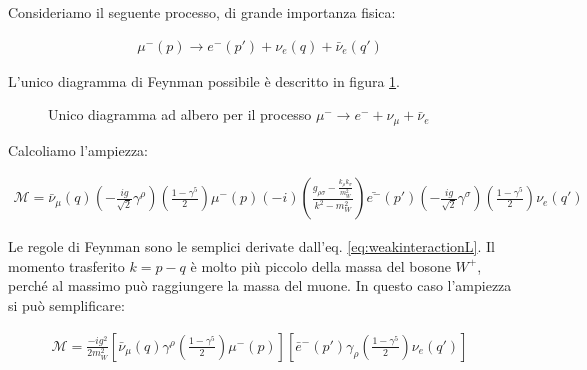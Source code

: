 \documentclass[11pt]{report}
\begin{document}
Consideriamo il seguente processo, di grande importanza fisica: 

\begin{align}
    \mu^-(p) \rightarrow e^-(p') + \nu_e(q) + \bar{\nu}_e(q')
\end{align}

L'unico diagramma di Feynman possibile è descritto in figura \ref{fig:betadecay}.

\begin{figure}
    \caption{Unico diagramma ad albero per il processo \(\mu^- \rightarrow e^- + \nu_\mu + \bar{\nu}_e\)}
    \label{fig:betadecay}
    \begin{center}
    \end{center}
\end{figure}

Calcoliamo l'ampiezza: 

\begin{align}
    \mathcal{M} = \bar{\nu}_\mu (q)\left(-\frac{ig}{\sqrt{2}}\gamma^\rho \right)\left(\frac{1-\gamma^5}{2} \right)\mu^-(p) (-i)\left(\frac{g_{\rho\sigma} - \frac{k_\rho k_\sigma}{m_W^2}}{k^2-m^2_W} \right)\bar{e^-}(p')\left(-\frac{ig}{\sqrt{2}}\gamma^\sigma \right)\left(\frac{1-\gamma^5}{2} \right)\nu_e(q')
\end{align}

Le regole di Feynman sono le semplici derivate dall'eq. \ref{eq:weakinteractionL}. Il momento trasferito \(k = p-q\) è molto più piccolo della massa del bosone \(W^+\), perché al massimo può raggiungere la massa del muone. In questo caso l'ampiezza si può semplificare: 

\begin{align}
    \mathcal{M} = \frac{-ig^2}{2m_W^2}\left[\bar{\nu}_\mu(q)\gamma^\rho \left(\frac{1-\gamma^5}{2} \right)\mu^-(p)\right]\left[\bar{e}^-(p')\gamma_\rho \left(\frac{1-\gamma^5}{2} \right)\nu_e(q')\right]
\end{align}
\end{document}
